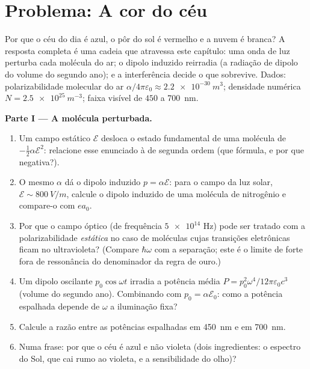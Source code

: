 \section{Problema: A cor do céu}

\begin{problem}\label{pb:b3:perturbation-theory:1}
Por que o céu do dia é azul, o pôr do sol é vermelho e a nuvem é
branca? A resposta completa é uma cadeia que atravessa este capítulo:
uma onda de luz perturba cada molécula do ar; o dipolo induzido
reirradia (a radiação de dipolo do volume do segundo ano); e a
interferência decide o que sobrevive. Dados: polarizabilidade molecular
do ar $\alpha/4\pi\varepsilon_0 \approx \qty{2.2e-30}{m^3}$; densidade
numérica $N = \qty{2.5e25}{m^{-3}}$; faixa visível de
$450$ a \qty{700}{nm}.

\medskip\noindent\textbf{Parte I --- A molécula perturbada.}
\begin{enumerate}
  \item Um campo estático $\mathcal E$ desloca o estado fundamental de
        uma molécula de $-\tfrac12\alpha\mathcal E^2$: relacione esse
        enunciado à  de segunda ordem (que
        fórmula, e por que negativa?).
  \item O mesmo $\alpha$ dá o dipolo induzido $p =
        \alpha\mathcal E$: para o campo da luz solar, $\mathcal E \sim
        \qty{800}{V/m}$, calcule o dipolo induzido de uma molécula de
        nitrogênio e compare-o com $ea_0$.
  \item Por que o campo óptico (de frequência $\num{5e14}$ Hz) pode ser
        tratado com a polarizabilidade \emph{estática} no caso de
        moléculas cujas transições eletrônicas ficam no ultravioleta?
        (Compare $\hbar\omega$ com a separação; este é o limite de
        forte fora de ressonância do denominador da regra de ouro.)
  \item Um dipolo oscilante $p_0\cos\omega t$ irradia a potência média
        $P = p_0^2\omega^4/12\pi\varepsilon_0c^3$ (volume do segundo
        ano). Combinando com $p_0 = \alpha\mathcal
        E_0$: como a potência espalhada depende de $\omega$ a
        iluminação fixa?
  \item Calcule a razão entre as potências espalhadas em \qty{450}{nm}
        e em \qty{700}{nm}.
  \item Numa frase: por que o céu é azul e não violeta (dois
        ingredientes: o espectro do Sol, que cai rumo ao violeta, e a
        sensibilidade do olho)?
\end{enumerate}


\end{problem}
